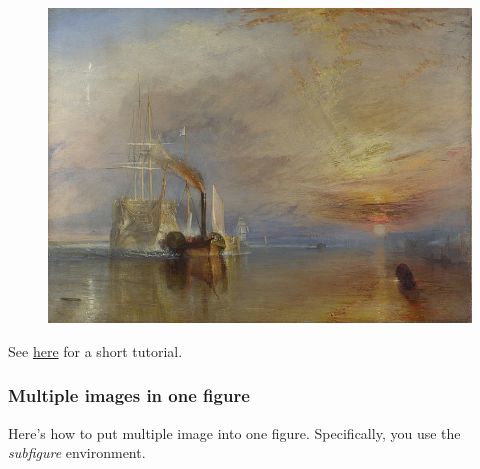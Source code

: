 \documentclass{article}
\begin{document}
\begin{figure}[H]
    \centering
    \includegraphics[scale=0.1]{temeraire.jpg}
    \caption{}
    \label{fig:temeraire_scale}
\end{figure} 

See \href{https://www.overleaf.com/learn/latex/Questions/How_do_I_specify_the_size_of_an_image_in_LaTeX\%3F}{here} for a short tutorial.

\subsubsection{Multiple images in one figure} Here's how to put multiple image into one figure. Specifically, you use the \textit{subfigure} environment.
\end{document}
